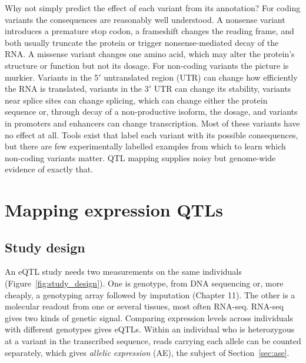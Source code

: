 Why not simply predict the effect of each variant from its annotation? For coding variants the consequences are reasonably well understood. A nonsense variant introduces a premature stop codon, a frameshift changes the reading frame, and both usually truncate the protein or trigger nonsense-mediated decay of the RNA. A missense variant changes one amino acid, which may alter the protein's structure or function but not its dosage. For non-coding variants the picture is murkier. Variants in the 5$'$ untranslated region (UTR) can change how efficiently the RNA is translated, variants in the 3$'$ UTR can change its stability, variants near splice sites can change splicing, which can change either the protein sequence or, through decay of a non-productive isoform, the dosage, and variants in promoters and enhancers can change transcription. Most of these variants have no effect at all. Tools exist that label each variant with its possible consequences, but there are few experimentally labelled examples from which to learn which non-coding variants matter. QTL mapping supplies noisy but genome-wide evidence of exactly that.

\section{Mapping expression QTLs}

\subsection{Study design}

An eQTL study needs two measurements on the same individuals (Figure~\ref{fig:study_design}). One is genotype, from DNA sequencing or, more cheaply, a genotyping array followed by imputation (Chapter 11). The other is a molecular readout from one or several tissues, most often RNA-seq. RNA-seq gives two kinds of genetic signal. Comparing expression levels across individuals with different genotypes gives eQTLs. Within an individual who is heterozygous at a variant in the transcribed sequence, reads carrying each allele can be counted separately, which gives \emph{allelic expression} (AE), the subject of Section~\ref{sec:ase}.


